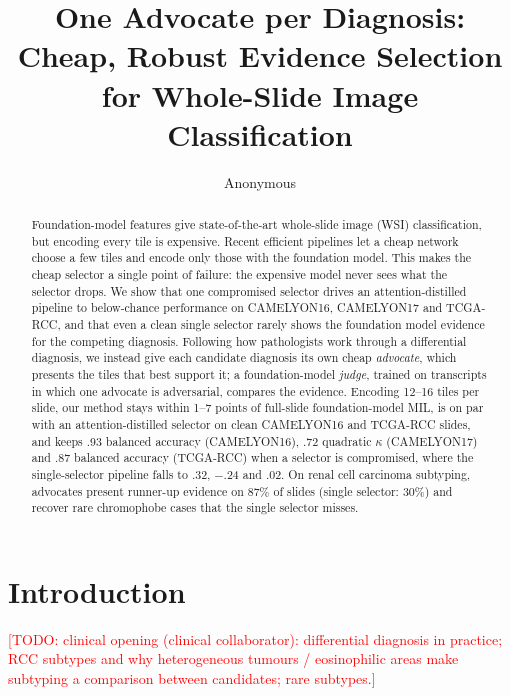 \documentclass[runningheads]{llncs}
\newcommand{\todo}[1]{\textcolor{red}{[TODO: #1]}}
\begin{document}
\title{One Advocate per Diagnosis: Cheap, Robust Evidence Selection for Whole-Slide Image Classification}
\author{Anonymous}
\maketitle

\begin{abstract}
Foundation-model features give state-of-the-art whole-slide image (WSI) classification, but encoding every tile is expensive. Recent efficient pipelines let a cheap network choose a few tiles and encode only those with the foundation model. This makes the cheap selector a single point of failure: the expensive model never sees what the selector drops. We show that one compromised selector drives an attention-distilled pipeline to below-chance performance on CAMELYON16, CAMELYON17 and TCGA-RCC, and that even a clean single selector rarely shows the foundation model evidence for the competing diagnosis. Following how pathologists work through a differential diagnosis, we instead give each candidate diagnosis its own cheap \emph{advocate}, which presents the tiles that best support it; a foundation-model \emph{judge}, trained on transcripts in which one advocate is adversarial, compares the evidence. Encoding 12--16 tiles per slide, our method stays within 1--7 points of full-slide foundation-model MIL, is on par with an attention-distilled selector on clean CAMELYON16 and TCGA-RCC slides, and keeps .93 balanced accuracy (CAMELYON16), .72 quadratic $\kappa$ (CAMELYON17) and .87 balanced accuracy (TCGA-RCC) when a selector is compromised, where the single-selector pipeline falls to .32, $-$.24 and .02. On renal cell carcinoma subtyping, advocates present runner-up evidence on 87\% of slides (single selector: 30\%) and recover rare chromophobe cases that the single selector misses.
\end{abstract}

\section{Introduction}
\todo{clinical opening (clinical collaborator): differential diagnosis in practice; RCC subtypes and why heterogeneous tumours / eosinophilic areas make subtyping a comparison between candidates; rare subtypes.}
\end{document}
